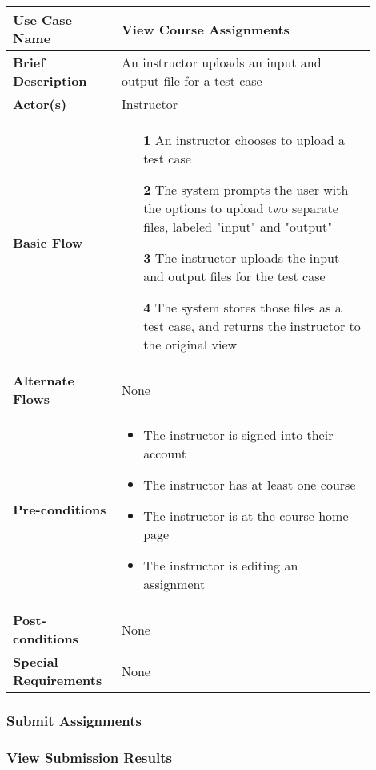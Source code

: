 \documentclass{article}
\begin{document}
\begin{tabular}{| p{0.25\linewidth} | p{0.65\linewidth} |}
  \hline
  \textbf{Use Case Name} & View Course Assignments \\
  \hline
  \textbf{Brief Description} & An instructor uploads an input and output file for a test case  \\
  \hline
  \textbf{Actor(s)} & Instructor \\
  \hline
  \textbf{Basic Flow} & \begin{itemize}
    \item[\textbf{1}] An instructor chooses to upload a test case
    \item[\textbf{2}] The system prompts the user with the options to upload two separate files, labeled "input" and "output"
    \item[\textbf{3}] The instructor uploads the input and output files for the test case
    \item[\textbf{4}] The system stores those files as a test case, and returns the instructor to the original view
  \end{itemize}\\
  \hline
  \textbf{Alternate Flows} & None \\
  \hline
  \textbf{Pre-conditions} & \begin{itemize}
    \item The instructor is signed into their account
    \item The instructor has at least one course
    \item The instructor is at the course home page
    \item The instructor is editing an assignment
  \end{itemize} \\
  \hline
  \textbf{Post-conditions} & None \\
  \hline
  \textbf{Special Requirements} & None \\
  \hline
\end{tabular}




\subsubsection{Submit Assignments}


\subsubsection{View Submission Results}
\end{document}
